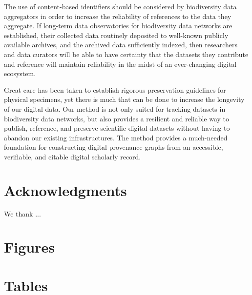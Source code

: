 The use of content-based identifiers should be considered by biodiversity data aggregators in order to increase the reliability of references to the data they aggregate. If long-term data observatories for biodiversity data networks are established, their collected data routinely deposited to well-known publicly available archives, and the archived data sufficiently indexed, then researchers and data curators will be able to have certainty that the datasets they contribute and reference will maintain reliability in the midst of an ever-changing digital ecosystem. 

Great care has been taken to establish rigorous preservation guidelines for physical specimens, yet there is much that can be done to increase the longevity of our digital data. Our method is not only suited for tracking datasets in biodiversity data networks, but also provides a resilient and reliable way to publish, reference, and preserve scientific digital datasets without having to abandon our existing infrastructures. The method provides a much-needed foundation for constructing digital provenance graphs from an accessible, verifiable, and citable digital scholarly record. 


\section*{Acknowledgments}
We thank ...

\nolinenumbers







\newpage
\section*{Figures}








\clearpage
\newpage
\section*{Tables}




